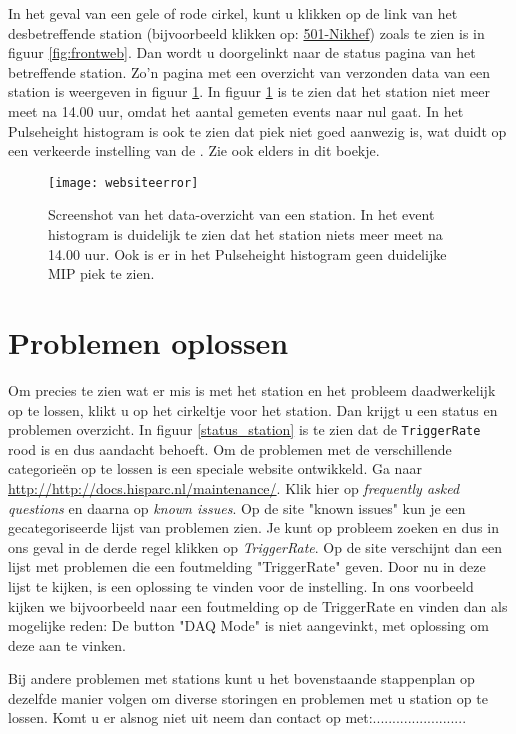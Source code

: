 In het geval van een gele of rode cirkel, kunt u klikken op de link van het
desbetreffende station (bijvoorbeeld klikken op: \underline{501-Nikhef}) zoals te zien is in figuur \ref{fig:frontweb}. 
Dan wordt u doorgelinkt naar de status pagina van het betreffende station. Zo'n
pagina met een overzicht van verzonden data van een station is weergeven
in figuur \ref{fig:websiteproblem}. In figuur \ref{fig:websiteproblem}
is te zien dat het station niet meer meet na 14.00 uur,  omdat het aantal
gemeten events naar nul gaat. In het Pulseheight histogram is ook te zien
dat \mip piek niet goed aanwezig is, wat duidt op een verkeerde
instelling van de \pmt. Zie ook \cite{inregelen} elders in dit boekje.

\begin{figure} 
\centering 
\texttt{[image: websiteerror]}
\label{fig:websiteproblem} 
\caption{Screenshot van het data-overzicht van een
station. In het event histogram is duidelijk te zien dat het station
niets meer meet na 14.00 uur. Ook is er in het Pulseheight histogram
geen duidelijke MIP piek te zien.} 
\end{figure}

\section{Problemen oplossen}

Om precies te zien wat er mis is met het station en het probleem
daadwerkelijk op te lossen, klikt u op het cirkeltje voor het station.
Dan krijgt u een status en problemen overzicht. In figuur \ref{status_station} is te zien dat de \verb|TriggerRate|
rood is en dus aandacht behoeft.
Om de problemen met de verschillende categorieën op te lossen is een speciale website ontwikkeld.
Ga naar \url{http://http://docs.hisparc.nl/maintenance/}. Klik hier op \emph{frequently asked questions} en daarna op \emph{known issues}. Op de site "known issues"  kun je een gecategoriseerde lijst van problemen zien. Je kunt op probleem zoeken en dus in ons geval in de derde regel klikken op \emph{TriggerRate}. Op de site verschijnt dan een lijst met problemen die een foutmelding "TriggerRate" geven. 
Door nu in deze lijst te kijken, is een oplossing te vinden voor de instelling.
In ons voorbeeld kijken we bijvoorbeeld naar een foutmelding op de TriggerRate en vinden dan als mogelijke reden:
De button "DAQ Mode" is niet aangevinkt, met oplossing om deze aan te vinken.

Bij andere problemen met stations kunt u het bovenstaande stappenplan op dezelfde manier volgen om diverse storingen en problemen met u station op te lossen.
Komt u er alsnog niet uit neem dan contact op met:........................
 

